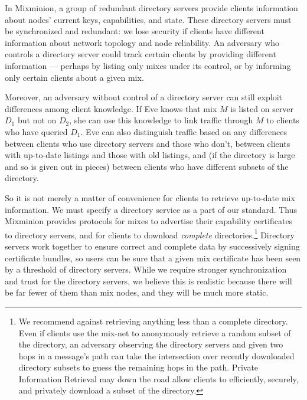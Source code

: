 \documentclass[final]{ieee}
\begin{document}
In Mixminion, a group of redundant directory servers provide clients
information about nodes' current keys, capabilities, and state.
These directory servers must be synchronized and redundant: we lose security if
clients have different information about network topology and node
reliability. An adversary who controls a directory server could track
certain clients by providing different information --- perhaps by listing
only mixes under its control, or by informing only certain clients about a
given mix.

Moreover, an adversary without control of a directory server can still exploit
differences among client knowledge. If Eve knows that mix $M$ is listed
on server $D_1$ but not on $D_2$, she can use this knowledge to link
traffic through $M$ to clients who have queried $D_1$.  Eve can also
distinguish traffic based on any differences between clients who use
directory servers and those who don't, between clients with up-to-date
listings and those with old listings, and (if the directory is large
and so is given out in pieces) between clients who have different subsets
of the directory.

So it is not merely a matter of convenience for clients to retrieve
up-to-date mix information.
We must specify a directory
service as a part of our standard. Thus Mixminion provides protocols for
mixes to advertise their capability certificates to directory servers,
and for clients to download \emph{complete} directories.\footnote{
  We recommend against retrieving anything less than a complete directory.
  Even if clients use the mix-net to anonymously retrieve a random
  subset of the directory, an adversary observing the directory servers
  and given two hops in a message's path can take the intersection over
  recently downloaded directory subsets to guess the remaining hops in
  the path. Private Information Retrieval \cite{malkin-thesis} may down
  the road allow clients to efficiently, securely, and privately download
  a subset of the directory.
}
Directory servers work together to ensure correct and complete data by
successively signing certificate bundles, so users can be sure that a
given mix certificate has been seen by a threshold of directory servers.
While we require stronger synchronization and trust for the directory
servers, we believe this is realistic because there will be far fewer
of them than mix nodes, and they will be much more static.
\end{document}
